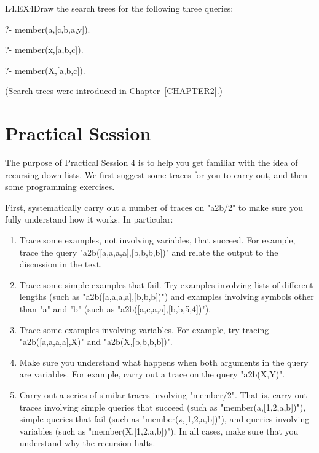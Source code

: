 \begin{LPNexercise}{L4.EX4}Draw the search trees for the following three queries:

\begin{LPNcodedisplay}
?- member(a,[c,b,a,y]).

?- member(x,[a,b,c]).

?- member(X,[a,b,c]).

\end{LPNcodedisplay}
(Search trees were introduced in Chapter~\ref{CHAPTER2}.)
\end{LPNexercise}


\section{Practical Session}\label{SEC.L4.PRAXIS}



The purpose of Practical Session 4 is to help you get familiar with
the idea of recursing down lists.  We first suggest some traces for
you to carry out, and then some programming exercises.

First, systematically carry out a number of traces on
"a2b/2" to make sure you fully understand how it
works. In particular:

\begin{enumerate}
\item{}Trace some examples, not involving variables, that succeed. For
example, trace the query "a2b([a,a,a,a],[b,b,b,b])" and relate the
output to the discussion in the text.
\item{}Trace some simple examples that fail. Try
examples involving  lists of different lengths
(such as "a2b([a,a,a,a],[b,b,b])") and
examples involving  symbols other than "a" and "b"
(such as "a2b([a,c,a,a],[b,b,5,4])").
\item{}Trace some examples involving variables. For example, try
tracing "a2b([a,a,a,a],X)" and "a2b(X,[b,b,b,b])".
\item{}Make sure you understand what happens when
both arguments in the query are variables. For example, carry
out a trace on the query "a2b(X,Y)".
\item{}Carry out a series of similar traces involving
"member/2". That is, carry out traces involving simple queries that
succeed (such as "member(a,[1,2,a,b])"), simple queries that fail
(such as "member(z,[1,2,a,b])"), and queries involving variables
(such as "member(X,[1,2,a,b])").  In all cases, make sure that
you understand why the recursion halts.
\end{enumerate}


